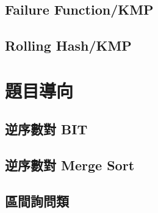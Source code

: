 	\subsection{Failure Function/KMP}
		
	\subsection{Rolling Hash/KMP}
		
\section{題目導向}
	\subsection{逆序數對 BIT}
		
	\subsection{逆序數對 Merge Sort}
		
	\subsection{區間詢問類}
		
